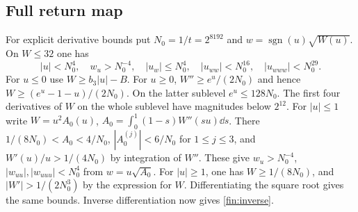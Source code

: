 \subsection{Full return map}
For explicit derivative bounds put \(N_0=1/t=2^{8192}\) and
\(w=\operatorname{sgn}(u)\sqrt{W(u)}\). On \(W\le32\) one has
\begin{equation}
 |u|<N_0^4,\quad w_u>N_0^{-4},\quad
 |u_w|\le N_0^4,\quad |u_{ww}|<N_0^{16},\quad |u_{www}|<N_0^{29}.         \label{fin:inverse}
\end{equation}
For \(u\le0\) use \(W\ge b_3|u|-B\). For \(u\ge0\),
\(W''\ge e^u/(2N_0)\) and hence \(W\ge(e^u-1-u)/(2N_0)\). On the latter
sublevel \(e^u\le128N_0\). The first four derivatives of \(W\) on the whole
sublevel have magnitudes below \(2^{12}\). For \(|u|\le1\) write
\(W=u^2 A_0(u)\), \(A_0=\int_0^1(1-s)W''(su)\dd s\). There
\(1/(8N_0)<A_0<4/N_0\), \(|A_0^{(j)}|<6/N_0\) for \(1\le j\le3\), and
\(W'(u)/u>1/(4N_0)\) by integration of \(W''\). These give
\(w_u>N_0^{-4}\), \(|w_{uu}|,|w_{uuu}|<N_0^4\) from \(w=u\sqrt{A_0}\).
For \(|u|\ge1\), one has \(W\ge1/(8N_0)\), and \(|W'|>1/(2N_0^3)\) by
the expression for \(W\). Differentiating the square root gives the same bounds. Inverse
differentiation now gives \eqref{fin:inverse}.

